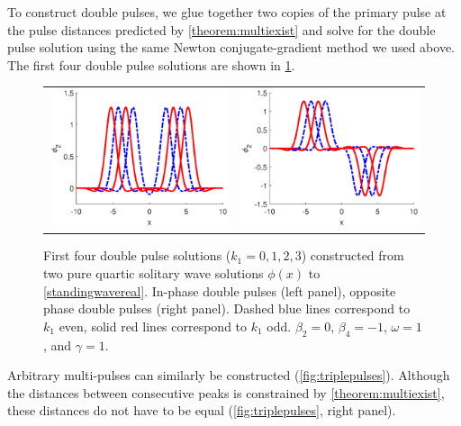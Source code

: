 \documentclass[12pt]{elsarticle}
\begin{document}
To construct double pulses, we glue together two copies of the primary pulse at the pulse distances predicted by \cref{theorem:multiexist} and solve for the double pulse solution using the same Newton conjugate-gradient method we used above. The first four double pulse solutions are shown in \cref{fig:doublepulses}. 
\begin{figure}[H]
\centering
\begin{tabular}{cc}
\includegraphics[width=8cm]{images/DPplus.eps} &
\includegraphics[width=8cm]{images/DPminus.eps}
\end{tabular}
\caption{First four double pulse solutions ($k_1 = 0, 1, 2, 3$) constructed from two pure quartic solitary wave solutions $\phi(x)$ to \cref{standingwavereal}. In-phase double pulses (left panel), opposite phase double pulses (right panel). Dashed blue lines correspond to $k_1$ even, solid red lines correspond to $k_1$ odd. $\beta_2 = 0$, $\beta_4 = -1$, $\omega = 1$, and $\gamma = 1$. }
\label{fig:doublepulses}
\end{figure} 

Arbitrary multi-pulses can similarly be constructed (\cref{fig:triplepulses}). Although the distances between consecutive peaks is constrained by \cref{theorem:multiexist}, these distances do not have to be equal (\cref{fig:triplepulses}, right panel).
\end{document}
